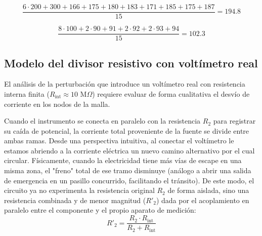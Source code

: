 \begin{equation}
    \frac{ 6 \cdot 200 + 300 + 166 + 175 + 180 + 183 + 171 + 185 + 175 + 187 }{15} = 194.8
\end{equation}

\begin{table}[H]
    \centering
    \caption{Resistencia en cada punto de la segunda medición}
    \label{tab:resistencia_promedio_2}
\end{table}

\begin{equation}
    \frac{ 8 \cdot 100 + 2 \cdot 90 + 91 + 2 \cdot 92 + 2 \cdot 93 + 94 }{15} = 102.3
\end{equation}

\clearpage
\subsection{Modelo del divisor resistivo con voltímetro real}
\label{subsec:apendice-divisor-real}

El análisis de la perturbación que introduce un voltímetro real con resistencia interna finita ($R_{\text{int}} \approx 10\text{ M}\Omega$) requiere evaluar de forma cualitativa el desvío de corriente en los nodos de la malla. 

Cuando el instrumento se conecta en paralelo con la resistencia $R_2$ para registrar su caída de potencial, la corriente total proveniente de la fuente se divide entre ambas ramas. Desde una perspectiva intuitiva, al conectar el voltímetro le estamos abriendo a la corriente eléctrica un nuevo camino alternativo por el cual circular. Físicamente, cuando la electricidad tiene más vías de escape en una misma zona, el "freno" total de ese tramo disminuye (análogo a abrir una salida de emergencia en un pasillo concurrido, facilitando el tránsito). De este modo, el circuito ya no experimenta la resistencia original $R_2$ de forma aislada, sino una resistencia combinada y de menor magnitud ($R'_2$) dada por el acoplamiento en paralelo entre el componente y el propio aparato de medición:
\begin{equation}
    R'_2 = \frac{R_2 \cdot R_{\text{int}}}{R_2 + R_{\text{int}}}
\end{equation}

